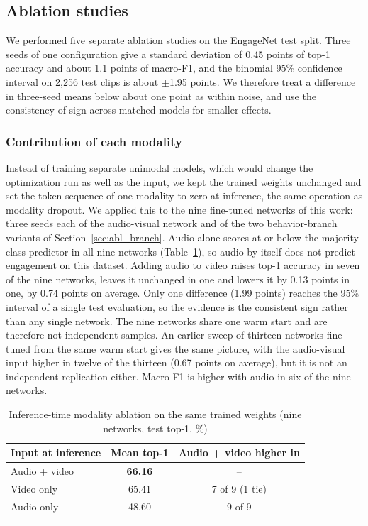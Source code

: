 \documentclass[pdflatex,iicol,sn-basic]{sn-jnl}
\begin{document}
\subsection{Ablation studies}\label{sec:ablation}

We performed five separate ablation studies on the EngageNet test split. Three seeds of one configuration give a standard deviation of 0.45 points of top-1 accuracy and about 1.1 points of macro-F1, and the binomial 95\% confidence interval on 2,256 test clips is about $\pm$1.95 points. We therefore treat a difference in three-seed means below about one point as within noise, and use the consistency of sign across matched models for smaller effects.

\subsubsection{Contribution of each modality}\label{sec:abl_modality}

Instead of training separate unimodal models, which would change the optimization run as well as the input, we kept the trained weights unchanged and set the token sequence of one modality to zero at inference, the same operation as modality dropout. We applied this to the nine fine-tuned networks of this work: three seeds each of the audio-visual network and of the two behavior-branch variants of Section~\ref{sec:abl_branch}. Audio alone scores at or below the majority-class predictor in all nine networks (Table~\ref{tab:modality}), so audio by itself does not predict engagement on this dataset. Adding audio to video raises top-1 accuracy in seven of the nine networks, leaves it unchanged in one and lowers it by 0.13 points in one, by 0.74 points on average. Only one difference (1.99 points) reaches the 95\% interval of a single test evaluation, so the evidence is the consistent sign rather than any single network. The nine networks share one warm start and are therefore not independent samples. An earlier sweep of thirteen networks fine-tuned from the same warm start gives the same picture, with the audio-visual input higher in twelve of the thirteen (0.67 points on average), but it is not an independent replication either. Macro-F1 is higher with audio in six of the nine networks.

\begin{table}[t]
\caption{Inference-time modality ablation on the same trained weights (nine networks, test top-1, \%)}\label{tab:modality}
\begin{tabular*}{\textwidth}{@{\extracolsep\fill}lcc}
\toprule
Input at inference & Mean top-1 & Audio + video higher in\\
\midrule
Audio + video & \textbf{66.16} & --\\
Video only & 65.41 & 7 of 9 (1 tie)\\
Audio only & 48.60 & 9 of 9\\
\botrule
\end{tabular*}
\end{table}
\end{document}
